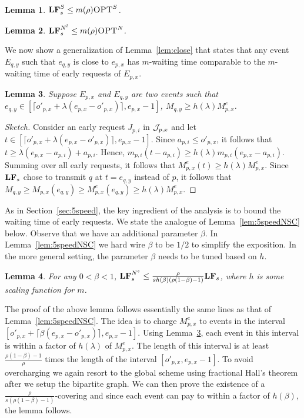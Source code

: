 \documentclass[11pt]{article}
\newtheorem{lemma}{Lemma}[section]
\newcommand{\opt}{\textrm{\sc OPT}}
\newcommand{\grdy}{\Algorithm{LF}}
\newcommand{\len}{\mathfrak{\rho}}
\newcommand{\ceil}[1]{\lceil #1 \rceil}
\newcommand{\cJ}{{\cal J}}
\begin{document}
\begin{titlepage}
\begin{lemma} \label{lem:GSC}
  $\grdy_s^{S} \leq m(\len) \opt^{S}$.
\end{lemma}



\begin{lemma}
  \label{lem:GNSCl}
  $\grdy^{N^l}_s \leq m(\len) \opt^{N}$.
\end{lemma}


We now show a generalization of Lemma~\ref{lem:close} that states that
any event $E_{q,y}$ such that $e_{q,y}$ is close to $e_{p,x}$ has
$m$-waiting time comparable to the $m$-waiting time of early requests of
$E_{p,x}$.

\begin{lemma}
\label{lem:rq_close} Suppose $E_{p,x}$ and $E_{q,y}$ are two events
  such that $e_{q,y} \in [\ceil{o'_{p,x} + \lambda(e_{p,x} -
    o'_{p,x})}, e_{p,x}-1]$, $M_{q,y} \geq h(\lambda)M^e_{p,x}$.
\end{lemma}
\begin{proof}[Sketch]
  Consider an early request $J_{p,i}$ in $\cJ_{p,x}$ and let $t \in
  [\ceil{o'_{p,x} + \lambda(e_{p,x} - o'_{p,x})}, e_{p,x}-1]$.  Since
  $a_{p,i} \le o'_{p,x}$, it follows that $t \ge \lambda (e_{p,x} -
  a_{p,i}) + a_{p,i}$. Hence, $m_{p,i}(t-a_{p,i}) \ge h(\lambda)m_{p,i}(e_{p,x}
  - a_{p,i})$. Summing over all early requests, it follows that
  $M^e_{p,x}(t) \ge h(\lambda) M^e_{p,x}$. Since $\grdy_s$ chose
  to transmit $q$ at $t = e_{q,y}$ instead of $p$, it follows that
  $M_{q,y} \ge M_{p,x}(e_{q,y}) \ge M^e_{p,x}(e_{q,y}) \ge h(\lambda)M^e_{p,x}$.
\end{proof}

As in Section~\ref{sec:5speed}, the key ingredient of the analysis is
to bound the waiting time of early requests. We state the analogue of
Lemma~\ref{lem:5speedNSC} below. Observe that we have an additional
parameter $\beta$. In Lemma~\ref{lem:5speedNSC} we hard wire $\beta$ to
be $1/2$ to simplify the exposition. In the more general setting, the
parameter $\beta$ needs to be tuned based on $h$.

\begin{lemma}
    \label{lem:GNSC}
    For any $0<\beta<1$, $\grdy_s^{N^e} \leq \frac{ \len
    }{s h(\beta)(\len(1-\beta)  -1)} \grdy_{s} $, where $h$ is some
    scaling function for $m$.
\end{lemma}

The proof of the above lemma follows essentially the same lines as
that of Lemma~\ref{lem:5speedNSC}. The idea is to charge $M^e_{p,x}$
to events in the interval $[o'_{p,x} + \ceil{\beta(e_{p,x} -
  o'_{p,x})}, e_{p,x}-1]$. Using Lemma~\ref{lem:rq_close}, each
event in this interval is within a factor of $h(\lambda)$ of $M^e_{p,x}$.  The length of this interval is at least
$\frac{\len(1-\beta) -1}{\rho}$ times the length of the interval $[o'_{p,x}, e_{p,x}-1]$. To avoid overcharging we
again resort to the global scheme using fractional Hall's theorem after we setup the bipartite graph. We can then prove
the existence of a $\frac{ \len }{s (\len(1-\beta) -1)}$-covering and since each event can pay to within a factor of
$h(\beta)$, the lemma follows.


\end{titlepage}
\end{document}
